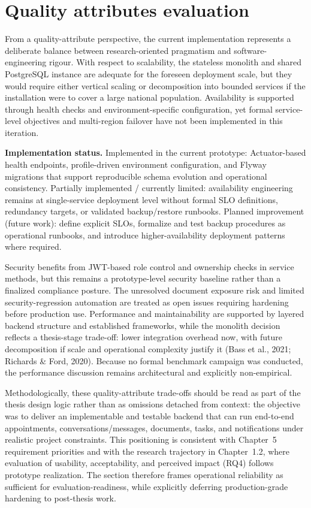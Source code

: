 \documentclass[11pt,a4paper,twoside,openany,headings=normal]{scrreprt}
\begin{document}
\section{Quality attributes evaluation}

From a quality-attribute perspective, the current implementation represents a deliberate balance between research-oriented pragmatism and software-engineering rigour. With respect to scalability, the stateless monolith and shared PostgreSQL instance are adequate for the foreseen deployment scale, but they would require either vertical scaling or decomposition into bounded services if the installation were to cover a large national population. Availability is supported through health checks and environment-specific configuration, yet formal service-level objectives and multi-region failover have not been implemented in this iteration.

\textbf{Implementation status.} Implemented in the current prototype: Actuator-based health endpoints, profile-driven environment configuration, and Flyway migrations that support reproducible schema evolution and operational consistency. Partially implemented / currently limited: availability engineering remains at single-service deployment level without formal SLO definitions, redundancy targets, or validated backup/restore runbooks. Planned improvement (future work): define explicit SLOs, formalize and test backup procedures as operational runbooks, and introduce higher-availability deployment patterns where required.

Security benefits from JWT-based role control and ownership checks in service methods, but this remains a prototype-level security baseline rather than a finalized compliance posture. The unresolved document exposure risk and limited security-regression automation are treated as open issues requiring hardening before production use. Performance and maintainability are supported by layered backend structure and established frameworks, while the monolith decision reflects a thesis-stage trade-off: lower integration overhead now, with future decomposition if scale and operational complexity justify it (Bass et al., 2021; Richards \& Ford, 2020). Because no formal benchmark campaign was conducted, the performance discussion remains architectural and explicitly non-empirical.

Methodologically, these quality-attribute trade-offs should be read as part of the thesis design logic rather than as omissions detached from context: the objective was to deliver an implementable and testable backend that can run end-to-end appointments, conversations/messages, documents, tasks, and notifications under realistic project constraints. This positioning is consistent with Chapter~5 requirement priorities and with the research trajectory in Chapter~1.2, where evaluation of usability, acceptability, and perceived impact (RQ4) follows prototype realization. The section therefore frames operational reliability as sufficient for evaluation-readiness, while explicitly deferring production-grade hardening to post-thesis work.
\end{document}
